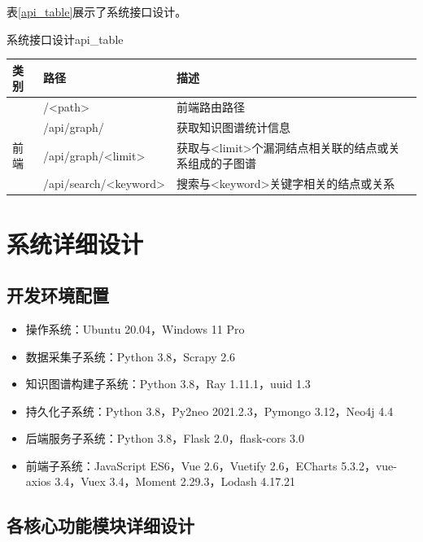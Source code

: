 \documentclass[a4paper,AutoFakeBold,oneside,12pt]{book}
\begin{document}
表\ref{api_table}展示了系统接口设计。
\begin{bupttable}{系统接口设计}{api_table}
	\begin{tabularx}{\textwidth}{llX}
		\toprule
		\textbf{类别} & \textbf{路径}         & \textbf{描述}                                         \\ \midrule
		              & /<path>               & 前端路由路径                                          \\ \cmidrule(l){2-3}
		              & /api/graph/           & 获取知识图谱统计信息                                  \\ \cmidrule(l){2-3}
		前端          & /api/graph/<limit>    & 获取与<limit>个漏洞结点相关联的结点或关系组成的子图谱 \\ \cmidrule(l){2-3}
		              & /api/search/<keyword> & 搜索与<keyword>关键字相关的结点或关系                 \\ \bottomrule %
	\end{tabularx}
\end{bupttable}

\section{系统详细设计}

\subsection{开发环境配置}

\begin{itemize}
	\item 操作系统：Ubuntu 20.04，Windows 11 Pro
	\item 数据采集子系统：Python 3.8，Scrapy 2.6
	\item 知识图谱构建子系统：Python 3.8，Ray 1.11.1，uuid 1.3
	\item 持久化子系统：Python 3.8，Py2neo 2021.2.3，Pymongo 3.12，Neo4j 4.4
	\item 后端服务子系统：Python 3.8，Flask 2.0，flask-cors 3.0
	\item 前端子系统：JavaScript ES6，Vue 2.6，Vuetify 2.6，ECharts 5.3.2，vue-axios 3.4，Vuex 3.4，Moment 2.29.3，Lodash 4.17.21
\end{itemize}

\subsection{各核心功能模块详细设计}
\end{document}
